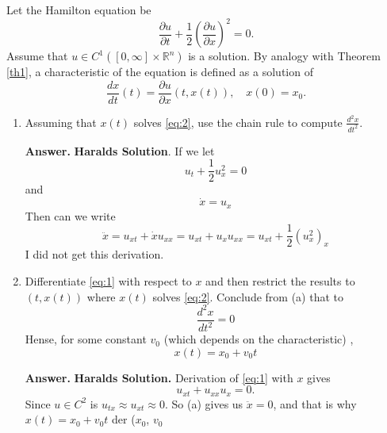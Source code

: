 \documentclass{article}
\theoremstyle{remark}
\begin{document}
Let the Hamilton equation be 
\begin{equation}
\label{eq:1}
\frac{\partial u}{\partial t}  + \frac{1}{2} \left( \frac{\partial u}{\partial x}  \right)^2 = 0
.\end{equation}
Assume that $u \in C^{1} \left( \left[ 0, \infty \right] \times  \mathbb{R} ^{n}  \right)$ is a solution.  By analogy with Theorem \ref{th1}, a characteristic of the equation is defined as a solution of 
  \begin{equation}
  \label{eq:2}
\frac{d x}{d t} \left( t \right) = \frac{\partial u}{\partial x}  \left( t, x\left( t \right) \right), \quad  x\left( 0 \right) = x_{0} 
  .\end{equation}
  \begin{enumerate}[label=(\alph*)]
    \item Assuming that $x\left( t \right)$ solves \eqref{eq:2}, use the chain rule to compute $\frac{d ^2 x}{d t^2} $.
\begin{tcolorbox}
  \textbf{Answer.} 
\textbf{Haralds Solution}. If we let \[
  u_{t} + \frac{1}{2} u_{x}^2 = 0
\] 
and \[
\dot{x} = u_{x}
\] 
Then can we write \[
\ddot{x} = u_{xt} + \dot{x}u_{xx} = u_{xt} + u_{x}u_{xx} = u_{xt} + \frac{1}{2 } \left( u_{x}^2 \right)_{x}
\] 
 I did not get this derivation. 
\end{tcolorbox}
    \item Differentiate \eqref{eq:1}  with respect to $x$ and then restrict the results to $\left( t, x\left( t \right) \right)$ where $x\left( t \right)$ solves \eqref{eq:2}. Conclude from (a) that to \[
    \frac{d ^2 x}{d t^2}  = 0
    \] 
    Hense, for some constant $v_{0}$ (which depends on the characteristic) ,\[
    x\left( t \right) = x_{0} + v_{0} t
    \] 
\begin{tcolorbox}
  \textbf{Answer.} 
\textbf{Haralds Solution.}  Derivation of \eqref{eq:1} with $x$  gives \[
u_{xt} + u_{xx} u_{x} = 0.
\] 
Since $u \in  C^{2}$ is $u_{t x} \approx u_{xt} \approx 0$. So (a) gives us $\ddot{x} = 0$, and that is why $x\left( t \right) = x_{0} + v_{0}t$ der ($x_{0}$, $v_{0}$


\end{tcolorbox}
\end{enumerate}
\end{document}
